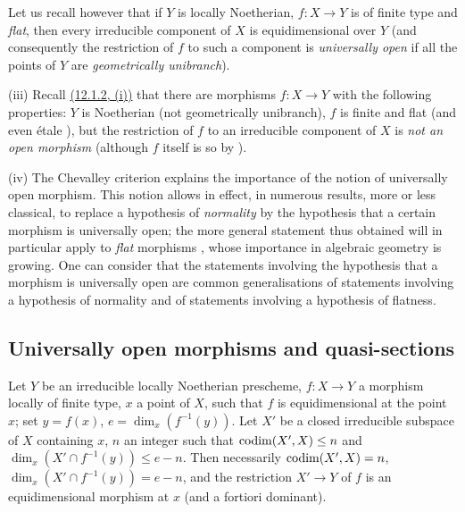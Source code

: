 \begin{remarks}[14.4.10]
Let us recall however  that if $Y$ is locally Noetherian, $f:X\to Y$ is of finite type and \emph{flat}, then every irreducible component of $X$ is equidimensional over $Y$ (and consequently the restriction of $f$ to such a component is \emph{universally open} if all the points of $Y$ are \emph{geometrically unibranch}).

(iii) Recall {\hyperref[IV.12.1.2]{(12.1.2, (i))}} that there are morphisms $f:X\to Y$ with the following properties: $Y$ is Noetherian (not geometrically unibranch), $f$ is finite and flat (and even \'etale ), but the restriction of $f$ to an irreducible component of $X$ is \emph{not an open morphism} (although $f$ itself is so by ).

(iv) The Chevalley criterion  explains the importance of the notion of universally open morphism.
This notion allows in effect, in numerous results, more or less classical, to replace a hypothesis of \emph{normality} by the hypothesis that a certain morphism is universally open; the more general statement
thus obtained will in particular apply to \emph{flat} morphisms , whose importance in algebraic geometry is growing.
One can consider that the statements involving the hypothesis that a morphism is universally open are common generalisations of statements involving a hypothesis of normality and of statements involving a hypothesis of flatness.
\end{remarks}


\subsection{Universally open morphisms and quasi-sections}
\label{subsection:IV.14.5}
\label{IV.14.5}

\begin{lemma}[14.5.1]
\label{IV.14.5.1}
Let $Y$ be an irreducible locally Noetherian prescheme, $f:X\to Y$ a morphism locally of finite type, $x$ a point of $X$, such that $f$ is equidimensional  at the point $x$; set $y=f(x)$, $e=\dim_x(f^{-1}(y))$.
Let $X'$ be a closed irreducible subspace of $X$ containing $x$, $n$ an integer such that $\operatorname{codim}(X',X)\leq n$ and $\dim_x(X'\cap f^{-1}(y))\leq e-n$.
Then necessarily $\operatorname{codim}(X',X)=n$, $\dim_x(X'\cap f^{-1}(y))=e-n$, and the restriction $X'\to Y$ of $f$ is an equidimensional morphism at $x$ (and a fortiori dominant).
\end{lemma}

